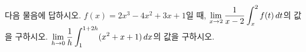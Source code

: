 다음 물음에 답하시오.
 $f(x)=2x^3-4x^2+3x+1$일 때, $\displaystyle\lim_{x\to 2}\dfrac{1}{x-2}\int_{x}^{2}f(t)\mkern3mu dt$의 값을 구하시오.
 $\displaystyle\lim_{h\to 0}\dfrac{1}{h}\int_{1}^{1+2h}(x^2+x+1)\mkern3mu dx$의 값을 구하시오.
